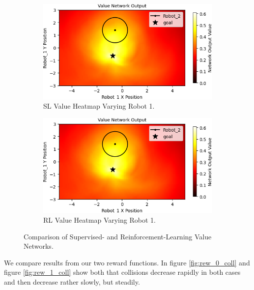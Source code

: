 \documentclass[conference]{IEEEtran}
\begin{document}
\begin{figure}[t]
    \centering
    \begin{subfigure}[b]{0.49\textwidth}
         \centering
         \includegraphics[width=\textwidth]{docs/latex/figures/heatmap_2_Robot_1.png}
         \caption{SL Value Heatmap Varying Robot 1.}
         \label{fig:heatmap_21}
     \end{subfigure}
     \hfill
     \begin{subfigure}[b]{0.49\textwidth}
         \centering
         \includegraphics[width=\textwidth]{docs/latex/figures/heatmap_2_Robot_1.png}
         \caption{RL Value Heatmap Varying Robot 1.}
         \label{fig:heatmap_22}
     \end{subfigure}
     \caption{Comparison of Supervised- and Reinforcement-Learning Value Networks.}\label{fig:heatmap_2}
\end{figure}

We compare results from our two reward functions. In figure \ref{fig:rew_0_coll} and figure  \ref{fig:rew_1_coll} show both that collisions decrease rapidly in both cases and then decrease rather slowly, but steadily. 
\end{document}
